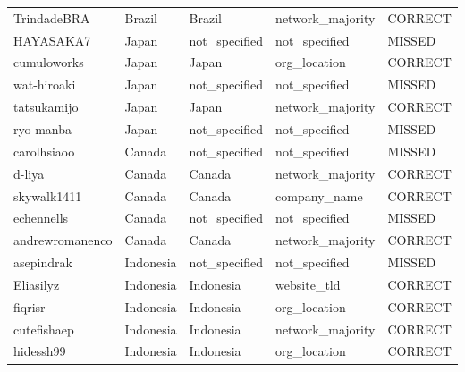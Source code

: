 \documentclass[11pt,a4paper]{article}
\begin{document}
\begin{longtable}{>{\ttfamily\small}p{4.4cm} p{3.0cm} p{3.0cm} p{2.6cm} p{1.6cm}}
\rowcolor{correct}  TrindadeBRA              & Brazil         & Brazil         & network\_majority & CORRECT \\
\rowcolor{missed}   HAYASAKA7                & Japan          & not\_specified & not\_specified   & MISSED  \\
\rowcolor{correct}  cumuloworks              & Japan          & Japan          & org\_location    & CORRECT \\
\rowcolor{missed}   wat-hiroaki              & Japan          & not\_specified & not\_specified   & MISSED  \\
\rowcolor{correct}  tatsukamijo              & Japan          & Japan          & network\_majority & CORRECT \\
\rowcolor{missed}   ryo-manba                & Japan          & not\_specified & not\_specified   & MISSED  \\
\rowcolor{missed}   carolhsiaoo              & Canada         & not\_specified & not\_specified   & MISSED  \\
\rowcolor{correct}  d-liya                   & Canada         & Canada         & network\_majority & CORRECT \\
\rowcolor{correct}  skywalk1411              & Canada         & Canada         & company\_name    & CORRECT \\
\rowcolor{missed}   echennells               & Canada         & not\_specified & not\_specified   & MISSED  \\
\rowcolor{correct}  andrewromanenco          & Canada         & Canada         & network\_majority & CORRECT \\
\rowcolor{missed}   asepindrak               & Indonesia      & not\_specified & not\_specified   & MISSED  \\
\rowcolor{correct}  Eliasilyz                & Indonesia      & Indonesia      & website\_tld     & CORRECT \\
\rowcolor{correct}  fiqrisr                  & Indonesia      & Indonesia      & org\_location    & CORRECT \\
\rowcolor{correct}  cutefishaep              & Indonesia      & Indonesia      & network\_majority & CORRECT \\
\rowcolor{correct}  hidessh99                & Indonesia      & Indonesia      & org\_location    & CORRECT \\

\end{longtable}
\end{document}
